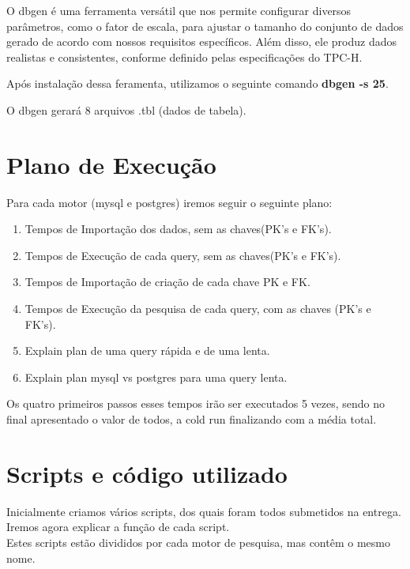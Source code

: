 \documentclass{article}
\begin{document}
\quad O dbgen é uma ferramenta versátil que nos permite configurar diversos parâmetros, como o fator de escala, para ajustar o tamanho do conjunto de dados gerado de acordo com nossos requisitos específicos. Além disso, ele produz dados realistas e consistentes, conforme definido pelas especificações do TPC-H.


\quad Após instalação dessa feramenta, utilizamos o seguinte comando \textbf{dbgen -s 25}.

\quad O dbgen gerará 8 arquivos .tbl (dados de tabela).




\section{Plano de Execução}


\quad Para cada motor (mysql e postgres) iremos seguir o seguinte plano:

\begin{enumerate}
    \item Tempos de Importação dos dados, sem as chaves(PK's e FK's).
    \item Tempos de Execução de cada query, sem as chaves(PK's e FK's).
    \item Tempos de Importação de criação de cada chave PK e FK.
    \item Tempos de Execução da pesquisa de cada query, com as chaves (PK's e FK's).
    \item Explain plan de uma query rápida e de uma lenta.
    \item Explain plan mysql vs postgres para uma query lenta.
\end{enumerate}

\quad Os quatro primeiros passos esses tempos irão ser executados 5 vezes, sendo no final apresentado o valor de todos, a cold run finalizando com a média total.\\

\section{Scripts e código utilizado}
\quad Inicialmente criamos vários scripts, dos quais foram todos submetidos na entrega. Iremos agora explicar a função de cada script.\\

\quad Estes scripts estão divididos por cada motor de pesquisa, mas contêm o mesmo nome.\\
\end{document}
